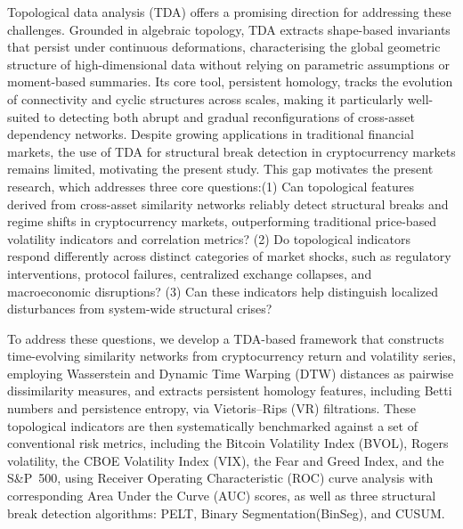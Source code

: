 \documentclass[11pt,reqno]{amsart}
\numberwithin{equation}{section} %
\begin{document}
Topological data analysis (TDA) offers a promising direction for addressing these challenges. 
Grounded in algebraic topology, TDA extracts shape-based invariants that persist under continuous deformations, characterising the global geometric structure of high-dimensional data without relying on parametric assumptions or moment-based summaries\cite{ravishanker2019topological,RN5499}. 
Its core tool, persistent homology, tracks the evolution of connectivity and cyclic structures across scales, making it particularly well-suited to detecting both abrupt and gradual reconfigurations of cross-asset dependency networks\citep{RN5498,RN5509}. 
Despite growing applications in traditional financial markets, the use of TDA for structural break detection in cryptocurrency markets remains limited, motivating the present study.
This gap motivates the present research, which addresses three core questions:(1) Can topological features derived from cross-asset similarity networks reliably detect structural breaks and regime shifts in cryptocurrency markets, outperforming traditional price-based volatility indicators and correlation metrics? (2) Do topological indicators respond differently across distinct categories of market shocks, such as regulatory interventions, protocol failures, centralized exchange collapses, and macroeconomic disruptions?
(3) Can these indicators help distinguish localized disturbances from system-wide structural crises?

To address these questions, we develop a TDA-based framework that constructs time-evolving similarity networks from cryptocurrency return and volatility series, employing Wasserstein and Dynamic Time Warping (DTW) distances as pairwise dissimilarity measures, and extracts persistent homology features, including Betti numbers and persistence entropy, via Vietoris--Rips (VR) filtrations. 
These topological indicators are then systematically benchmarked against a set of conventional risk metrics, including the Bitcoin Volatility Index (BVOL), Rogers volatility, the CBOE Volatility Index (VIX), the Fear and Greed Index, and the S\&P~500, using Receiver Operating Characteristic (ROC) curve analysis with corresponding Area Under the Curve (AUC) scores, as well as three structural break detection algorithms: PELT\citep{RN4351}, Binary Segmentation(BinSeg)\citep{RN4352}, and CUSUM\citep{page1963}.
\end{document}
